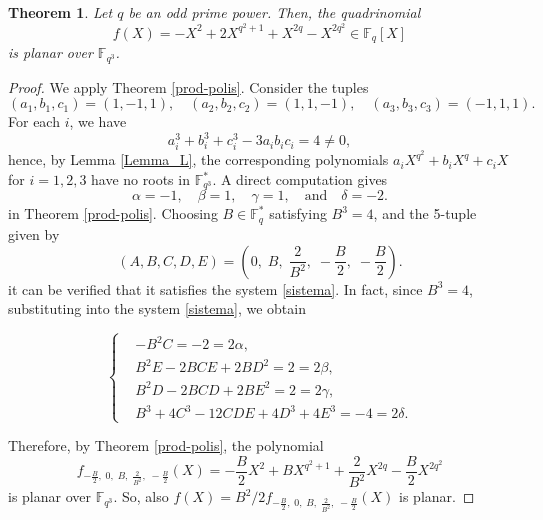 \documentclass[12pt]{amsart}
\newtheorem{theorem}{Theorem}[section]
\newcommand{\F}{\mathbb{F}}
\begin{document}
	
	\begin{theorem}\label{teo1}
		Let $q$ be an odd prime power. Then, the quadrinomial
		\[
		f(X) =  -X^2 + 2 X^{q^2+1} + X^{2q} - X^{2q^2} \in \mathbb{F}_q[X]
		\]
		is planar over $\mathbb{F}_{q^3}$.
	\end{theorem}
	\begin{proof}
		We apply Theorem \ref{prod-polis}. Consider the tuples
		\[
		(a_1,b_1,c_1) = (1,-1,1), \quad (a_2,b_2,c_2) = (1,1,-1), \quad (a_3,b_3,c_3) = (-1,1,1).
		\]
		For each $i$, we have
		\[
		a_i^3 + b_i^3 + c_i^3 - 3a_ib_ic_i = 4 \neq 0,
		\]
		hence, by Lemma \ref{Lemma_L}, the corresponding polynomials $a_iX^{q^2} + b_iX^q + c_iX$ for $i=1,2,3 $ have no roots in $\F_{q^3}^*$. A direct computation gives
		\[
		\alpha = -1, \quad \beta = 1, \quad \gamma = 1, \quad \mbox{and} \quad \delta = -2.
		\]
		in Theorem \ref{prod-polis}. Choosing $B \in \F_q^*$ satisfying $B^3 = 4$, and the 5-tuple given by
		\[
		(A,B,C,D,E) = \left(0,\; B,\; \frac{2}{B^2},\; -\frac{B}{2},\; -\frac{B}{2}\right).
		\]
		it can be verified that it satisfies the system \eqref{sistema}. In fact, since $B^3=4$, 
		substituting into the system \eqref{sistema}, we obtain
		
		$$	\begin{cases} 
			&-B^2C = -2 = 2\alpha,\\
			&B^2E - 2BCE + 2BD^2 = 2 = 2\beta,\\
			&B^2D - 2BCD + 2BE^2 = 2 = 2\gamma,\\
			&B^3 + 4C^3 - 12CDE + 4D^3 + 4E^3 = -4 = 2\delta.
		\end{cases} 
		$$
		
		Therefore, by Theorem \ref{prod-polis}, the polynomial
		\[
		f_{-\frac{B}{2},\; 0,\; B,\; \frac{2}{B^2},\; -\frac{B}{2} }(X) = - \frac{B}{2}X^2 + B X^{q^2+1} + \frac{2}{B^2}X^{2q} - \frac{B}{2}X^{2q^2}
		\]
		is planar over $\F_{q^3}$. So, also $f(X)=B^2/2f_{-\frac{B}{2},\; 0,\; B,\; \frac{2}{B^2},\; -\frac{B}{2}}(X)$ is planar.
	\end{proof}	
	
	
	
\end{document}
